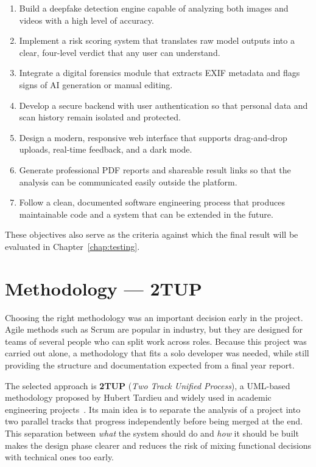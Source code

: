 \begin{enumerate}[leftmargin=*, label=\textbf{\arabic*.}]
    \item Build a deepfake detection engine capable of analyzing both images and videos with a high level of accuracy.
    \item Implement a risk scoring system that translates raw model outputs into a clear, four-level verdict that any user can understand.
    \item Integrate a digital forensics module that extracts EXIF metadata and flags signs of AI generation or manual editing.
    \item Develop a secure backend with user authentication so that personal data and scan history remain isolated and protected.
    \item Design a modern, responsive web interface that supports drag-and-drop uploads, real-time feedback, and a dark mode.
    \item Generate professional PDF reports and shareable result links so that the analysis can be communicated easily outside the platform.
    \item Follow a clean, documented software engineering process that produces maintainable code and a system that can be extended in the future.
\end{enumerate}

These objectives also serve as the criteria against which the final result will be evaluated in Chapter~\ref{chap:testing}.

\section{Methodology --- 2TUP}

Choosing the right methodology was an important decision early in the project. Agile methods such as Scrum are popular in industry, but they are designed for teams of several people who can split work across roles. Because this project was carried out alone, a methodology that fits a solo developer was needed, while still providing the structure and documentation expected from a final year report.

The selected approach is \textbf{2TUP} (\textit{Two Track Unified Process}), a UML-based methodology proposed by Hubert Tardieu and widely used in academic engineering projects~\cite{tardieu2002}. Its main idea is to separate the analysis of a project into two parallel tracks that progress independently before being merged at the end. This separation between \textit{what} the system should do and \textit{how} it should be built makes the design phase clearer and reduces the risk of mixing functional decisions with technical ones too early.

